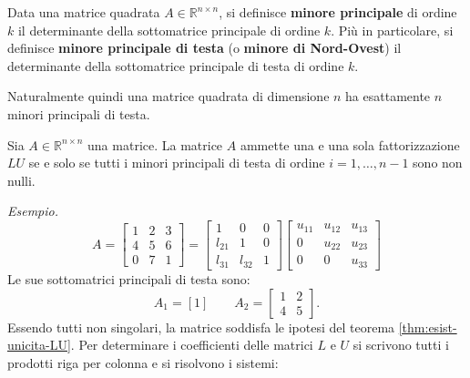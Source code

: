 \begin{definition}
    Data una matrice quadrata $A \in \mathbb{R}^{n\times n}$, si definisce \textbf{minore principale} di ordine $k$ il determinante della sottomatrice principale di ordine $k$. Più in particolare, si definisce \textbf{minore principale di testa} (o \textbf{minore di Nord-Ovest}) il determinante della sottomatrice principale di testa di ordine $k$.
\end{definition}
Naturalmente quindi una matrice quadrata di dimensione $n$ ha esattamente $n$ minori principali di testa.
\begin{theorem}
Sia $\displaystyle A\in \mathbb{R}^{n\times n}$ una matrice. La matrice $\displaystyle A$ ammette una e una sola fattorizzazione $\displaystyle LU$ se e solo se tutti i minori principali di testa di ordine $\displaystyle i=1,\dotsc ,n-1$ sono non nulli.
\label{thm:esist-unicita-LU}
\end{theorem}
\textit{Esempio.}
\begin{equation*}
A=\begin{bmatrix}
1 & 2 & 3\\
4 & 5 & 6\\
0 & 7 & 1
\end{bmatrix} =\begin{bmatrix}
1 & 0 & 0\\
l_{21} & 1 & 0\\
l_{31} & l_{32} & 1
\end{bmatrix}\begin{bmatrix}
u_{11} & u_{12} & u_{13}\\
0 & u_{22} & u_{23}\\
0 & 0 & u_{33}
\end{bmatrix}
\end{equation*}
Le sue sottomatrici principali di testa sono:
\begin{equation*}
A_{1} =[ 1] \qquad A_{2} =\begin{bmatrix}
1 & 2\\
4 & 5
\end{bmatrix}.
\end{equation*}
Essendo tutti non singolari, la matrice soddisfa le ipotesi del teorema \ref{thm:esist-unicita-LU}.
Per determinare i coefficienti delle matrici $L$ e $U$ si scrivono tutti i prodotti riga per colonna e si risolvono i sistemi:
